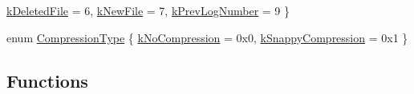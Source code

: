 \begin{DoxyCompactItemize}
\mbox{\hyperlink{namespaceleveldb_afa685d3afc34bc4ec96f33792276bc3fa6e96d3006bc411c9c461cb3b4dc67a96}{k\+Deleted\+File}} = 6, 
\mbox{\hyperlink{namespaceleveldb_afa685d3afc34bc4ec96f33792276bc3fae265c5eb525120ef5fd3284cd8b35220}{k\+New\+File}} = 7, 
\mbox{\hyperlink{namespaceleveldb_afa685d3afc34bc4ec96f33792276bc3fa3918f2a3f22eb62352c8e31f1ec161f3}{k\+Prev\+Log\+Number}} = 9
 \}
\item 
enum \mbox{\hyperlink{namespaceleveldb_a047a8e77a76becb82bab4720994f6f9b}{Compression\+Type}} \{ \mbox{\hyperlink{namespaceleveldb_a047a8e77a76becb82bab4720994f6f9baf76e1b293dd8aa0709003431de425552}{k\+No\+Compression}} = 0x0, 
\mbox{\hyperlink{namespaceleveldb_a047a8e77a76becb82bab4720994f6f9bad0d4e00e3596bcc3b9bdfd970900a06e}{k\+Snappy\+Compression}} = 0x1
 \}
\end{DoxyCompactItemize}
\subsection*{Functions}

